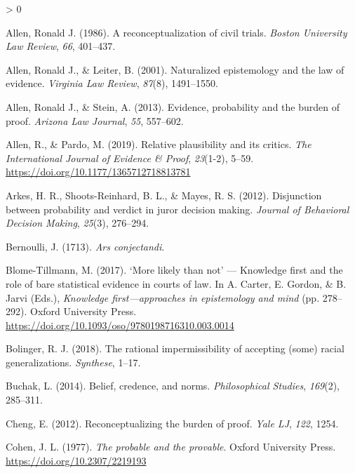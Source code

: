 \documentclass[
  10pt,
  dvipsnames,enabledeprecatedfontcommands]{scrartcl}
\newlength{\cslhangindent}
\newenvironment{CSLReferences}[2] %
 {%
  \setlength{\parindent}{0pt}
  \ifodd #1 \everypar{\setlength{\hangindent}{\cslhangindent}}\ignorespaces\fi
  \ifnum #2 > 0
  \setlength{\parskip}{#2\baselineskip}
  \fi
 }%
 {}
\begin{document}
\hypertarget{refs}{}
\begin{CSLReferences}{1}{0}
\leavevmode\hypertarget{ref-Allen1986A-Reconceptuali}{}%
Allen, Ronald J. (1986). A reconceptualization of civil trials.
\emph{Boston University Law Review}, \emph{66}, 401--437.

\leavevmode\hypertarget{ref-allen2001naturalized}{}%
Allen, Ronald J., \& Leiter, B. (2001). Naturalized epistemology and the
law of evidence. \emph{Virginia Law Review}, \emph{87}(8), 1491--1550.

\leavevmode\hypertarget{ref-allen2013}{}%
Allen, Ronald J., \& Stein, A. (2013). Evidence, probability and the
burden of proof. \emph{Arizona Law Journal}, \emph{55}, 557--602.

\leavevmode\hypertarget{ref-AllenPardo2019relative}{}%
Allen, R., \& Pardo, M. (2019). Relative plausibility and its critics.
\emph{The International Journal of Evidence {\&} Proof}, \emph{23}(1-2),
5--59. \url{https://doi.org/10.1177/1365712718813781}

\leavevmode\hypertarget{ref-arkesEtAl2012}{}%
Arkes, H. R., Shoots-Reinhard, B. L., \& Mayes, R. S. (2012).
Disjunction between probability and verdict in juror decision making.
\emph{Journal of Behavioral Decision Making}, \emph{25}(3), 276--294.

\leavevmode\hypertarget{ref-Bernoulli1713Ars-conjectandi}{}%
Bernoulli, J. (1713). \emph{Ars conjectandi}.

\leavevmode\hypertarget{ref-BlomeTillmann2017}{}%
Blome-Tillmann, M. (2017). {`{M}ore likely than not'} --- {K}nowledge
first and the role of bare statistical evidence in courts of law. In A.
Carter, E. Gordon, \& B. Jarvi (Eds.), \emph{Knowledge
first---approaches in epistemology and mind} (pp. 278--292). Oxford
University Press.
\url{https://doi.org/10.1093/oso/9780198716310.003.0014}

\leavevmode\hypertarget{ref-bolinger2018rational}{}%
Bolinger, R. J. (2018). The rational impermissibility of accepting
(some) racial generalizations. \emph{Synthese}, 1--17.

\leavevmode\hypertarget{ref-buchak2014belief}{}%
Buchak, L. (2014). Belief, credence, and norms. \emph{Philosophical
Studies}, \emph{169}(2), 285--311.

\leavevmode\hypertarget{ref-cheng2012reconceptualizing}{}%
Cheng, E. (2012). Reconceptualizing the burden of proof. \emph{Yale LJ},
\emph{122}, 1254.

\leavevmode\hypertarget{ref-Cohen1977The-probable-an}{}%
Cohen, J. L. (1977). \emph{The probable and the provable}. Oxford
University Press. \url{https://doi.org/10.2307/2219193}


\end{CSLReferences}
\end{document}
